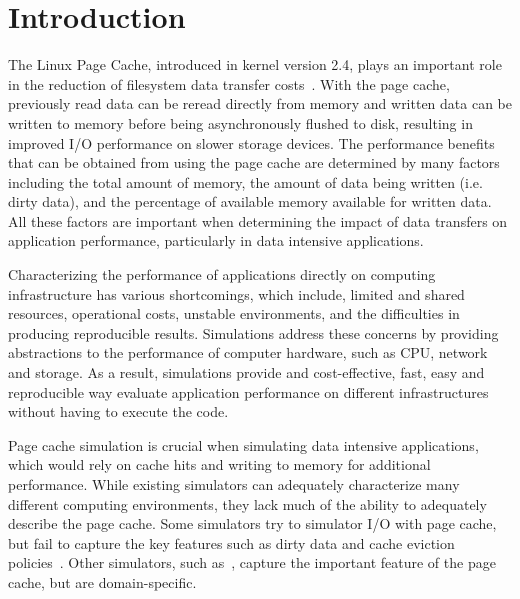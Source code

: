 \documentclass[conference]{IEEEtran}
\begin{document}
    \section{Introduction}
        
        The Linux Page Cache, introduced in kernel version 2.4, plays an important role in
        the reduction of filesystem data transfer costs~\cite{pagecache}. With the page cache, previously
        read data can be reread directly from memory and written data can be written to
        memory before being asynchronously flushed to disk, resulting in improved I/O performance
        on slower storage devices. The performance benefits that can be obtained from using the page
        cache are determined by many factors including the total amount of memory,
        the amount of data being written (i.e. dirty data), and the percentage of available memory available for
        written data. All these factors are important when determining the impact of data transfers on
        application performance, particularly in data intensive applications.

        Characterizing the performance of applications directly on computing infrastructure
        has various shortcomings, which include, limited and shared resources, operational
        costs, unstable environments, and the difficulties in producing reproducible results.
        Simulations address these concerns by providing abstractions to the performance of computer
        hardware, such as CPU, network and storage. As a result, simulations provide and
        cost-effective, fast, easy and reproducible  way evaluate application performance
        on different infrastructures without having to execute the code.


        Page cache simulation is crucial when simulating data intensive applications,
        which would rely on cache hits and writing to memory for additional performance.
        While existing simulators can adequately characterize many different computing environments,
        they lack much of the ability to adequately describe the page cache. Some
        simulators try to simulator I/O with page cache, but fail to capture the key features such
        as dirty data and cache eviction policies~\cite{nunez2012simcan,nunez2012icancloud}. 
        Other simulators, such as~\cite{xu2018}, capture the important feature of the
        page cache, but are domain-specific. 

\end{document}
